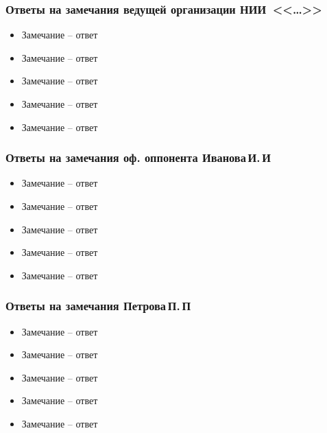\begin{frame}
    \frametitle{Ответы на замечания ведущей организации НИИ~<<\dots>>}
    \begin{itemize}
        \item Замечание -- ответ
        \item Замечание -- ответ
        \item Замечание -- ответ
        \item Замечание -- ответ
        \item Замечание -- ответ
    \end{itemize}
\end{frame}

\begin{frame}
    \frametitle{Ответы на замечания оф. оппонента Иванова\,И.\,И}
    \begin{itemize}
        \item Замечание -- ответ
        \item Замечание -- ответ
        \item Замечание -- ответ
        \item Замечание -- ответ
        \item Замечание -- ответ
    \end{itemize}
\end{frame}

\begin{frame}
    \frametitle{Ответы на замечания Петрова\,П.\,П}
    \begin{itemize}
        \item Замечание -- ответ
        \item Замечание -- ответ
        \item Замечание -- ответ
        \item Замечание -- ответ
        \item Замечание -- ответ
    \end{itemize}
\end{frame}
